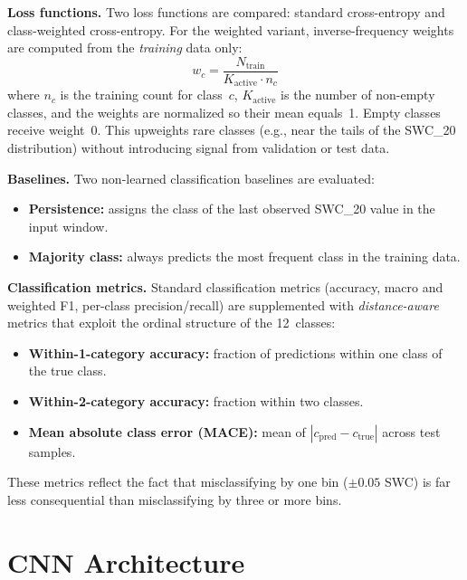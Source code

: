 \documentclass[11pt]{article}
\begin{document}
\textbf{Loss functions.} Two loss functions are compared: standard cross-entropy and
class-weighted cross-entropy. For the weighted variant, inverse-frequency weights are
computed from the \emph{training} data only:
\begin{equation}
    w_c = \frac{N_{\text{train}}}{K_{\text{active}} \cdot n_c}
\end{equation}
where $n_c$ is the training count for class~$c$, $K_{\text{active}}$ is the number
of non-empty classes, and the weights are normalized so their mean equals~1. Empty
classes receive weight~0. This upweights rare classes (e.g., near the tails of the
SWC\_20 distribution) without introducing signal from validation or test data.

\textbf{Baselines.} Two non-learned classification baselines are evaluated:
\begin{itemize}
    \item \textbf{Persistence:} assigns the class of the last observed SWC\_20 value
    in the input window.
    \item \textbf{Majority class:} always predicts the most frequent class in the
    training data.
\end{itemize}

\textbf{Classification metrics.} Standard classification metrics (accuracy, macro
and weighted F1, per-class precision/recall) are supplemented with
\emph{distance-aware} metrics that exploit the ordinal structure of the 12~classes:
\begin{itemize}
    \item \textbf{Within-1-category accuracy:} fraction of predictions within one
    class of the true class.
    \item \textbf{Within-2-category accuracy:} fraction within two classes.
    \item \textbf{Mean absolute class error (MACE):} mean of
    $|c_{\text{pred}} - c_{\text{true}}|$ across test samples.
\end{itemize}
These metrics reflect the fact that misclassifying by one bin ($\pm 0.05$ SWC) is
far less consequential than misclassifying by three or more bins.

\section{CNN Architecture}
\end{document}
